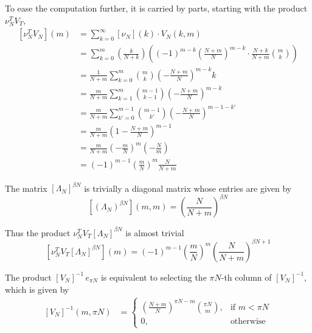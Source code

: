 \documentclass{article}
\newcommand{\ppar}[1]{\left( #1 \right)}
\newcommand{\spar}[1]{\left[ #1 \right]}
\begin{document}
%
To ease the computation further, it is carried by parts, starting with the product $\nu_N^T V_T$,
\begin{align*}
    \spar{\nu_N^T V_N}(m) &=
    \sum_{k=0}^\infty \spar{\nu_N}(k) \cdot V_N(k,m) \\
    &=
    \sum_{k=0}^m
    \ppar{\frac{k}{N+k}}
    \ppar{(-1)^{m-k} \ppar{\frac{N+m}{N}}^{m-k} \cdot \frac{N+k}{N+m} \binom{m}{k}}
    \\
    &=
    \frac{1}{N+m}
    \sum_{k=0}^m
    \binom{m}{k}
    \ppar{- \frac{N+m}{N}}^{m-k} k
    \\
    &=
    \frac{m}{N+m}
    \sum_{k=1}^m
    \binom{m-1}{k-1}
    \ppar{- \frac{N+m}{N}}^{m-k}
    \\
    &=
    \frac{m}{N+m}
    \sum_{k'=0}^{m-1}
    \binom{m-1}{k'}
    \ppar{- \frac{N+m}{N}}^{m-1-k'}
    \\
    &=
    \frac{m}{N+m}
    \ppar{1-\frac{N+m}{N}}^{m-1}
    \\
    &=
    \frac{m}{N+m}
    \ppar{-\frac{m}{N}}^m \ppar{-\frac{N}{m}}
    \\
    &=
    (-1)^{m-1} \ppar{\frac{m}{N}}^m \frac{N}{N+m}
\end{align*}

The matrix $\spar{\Lambda_N}^{\beta N}$ is trivially a diagonal matrix whose entries are given by
\begin{equation}
    \spar{\ppar{\Lambda_N}^{\beta N}}(m,m)
    =
    \ppar{\frac{N}{N+m}}^{\beta N}
\end{equation}

Thus the product $\nu_N^T V_T \spar{\Lambda_N}^{\beta N}$ is almost trivial
\begin{equation}
    \spar{\nu_N^T V_T \spar{\Lambda_N}^{\beta N}}(m)
    =
    (-1)^{m-1} \ppar{\frac{m}{N}}^m
    \ppar{\frac{N}{N+m}}^{\beta N+1}
\end{equation}

The product $\spar{V_N}^{-1}\,e_{\pi N}$ is equivalent to selecting the $\pi N$-th column of $\spar{V_N}^{-1}$, which is given by
\begin{align}
\spar{V_N}^{-1}(m, \pi N)
    &=
    \begin{cases}
        \ppar{\frac{N+m}{N}}^{\pi N-m} \binom{\pi N}{m},
        &\text{if } m<\pi N \\
        0, &\text{otherwise}
    \end{cases}
\end{align}
\end{document}
